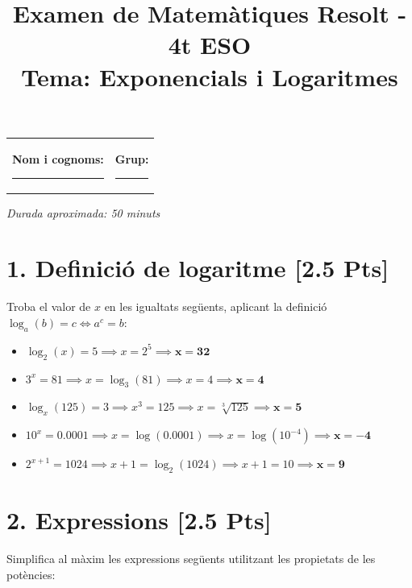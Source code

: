 \documentclass[a4paper,12pt]{article}
\title{Examen de Matemàtiques Resolt - 4t ESO\\ \large Tema: Exponencials i Logaritmes}
\author{}
\date{}
\begin{document}
\maketitle

\begin{tabular}{ll}
\textbf{Nom i cognoms:} \rule{8cm}{0.1pt} & \textbf{Grup:} \rule{2cm}{0.1pt} \\
\end{tabular}

\vspace{0.5cm}
\textit{Durada aproximada: 50 minuts}
\vspace{0.5cm}

\section*{1. Definició de logaritme [2.5 Pts]}
Troba el valor de $x$ en les igualtats següents, aplicant la definició $\log_a(b) = c \iff a^c = b$:

\begin{itemize}
    \item[a)] $\log_{2}(x)=5 \implies x = 2^5 \implies \mathbf{x = 32}$
    \item[b)] $3^{x}=81 \implies x = \log_3(81) \implies x = 4 \implies \mathbf{x = 4}$
    \item[c)] $\log_{x}(125)=3 \implies x^3 = 125 \implies x = \sqrt[3]{125} \implies \mathbf{x = 5}$
    \item[d)] $10^{x}=0.0001 \implies x = \log(0.0001) \implies x = \log(10^{-4}) \implies \mathbf{x = -4}$
    \item[e)] $2^{x+1}=1024 \implies x+1 = \log_2(1024) \implies x+1 = 10 \implies \mathbf{x = 9}$
\end{itemize}

\section*{2. Expressions [2.5 Pts]}
Simplifica al màxim les expressions següents utilitzant les propietats de les potències:
\end{document}
